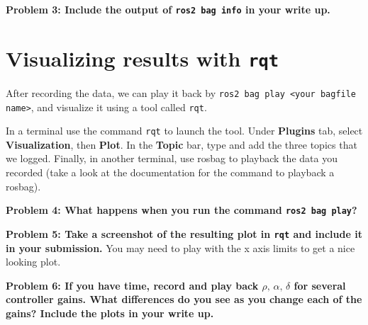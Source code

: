 \documentclass{article}
\begin{document}
\textbf{Problem 3: Include the output of \texttt{ros2 bag info} in your write up.}
\section{Visualizing results with \texttt{rqt}}
After recording the data, we can play it back by \texttt{ros2 bag play <your bagfile name>}, and visualize it using a tool called \texttt{rqt}. 

In a terminal use the command \texttt{rqt} to launch the tool. Under \textbf{Plugins} tab, select \textbf{Visualization}, then \textbf{Plot}. In the \textbf{Topic} bar, type and add the three topics that we logged. Finally, in another terminal, use rosbag to playback the data you recorded (take a look at the documentation for the command to playback a rosbag).

\textbf{Problem 4: What happens when you run the command \texttt{ros2 bag play}?}

\textbf{Problem 5: Take a screenshot of the resulting plot in \texttt{rqt} and include it in your submission.} You may need to play with the x axis limits to get a nice looking plot.

\textbf{Problem 6: If you have time, record and play back $\rho, \, \alpha, \, \delta$ for several controller gains. What differences do you see as you change each of the gains? Include the plots in your write up.}
\end{document}
